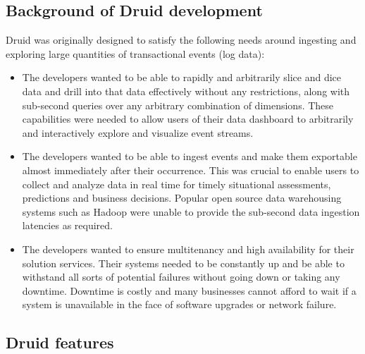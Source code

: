 \documentclass[letterpaper,10pt,english]{sphinxmanual}
\begin{document}
\subsection{Background of Druid development}
\label{\detokenize{discovery/part01/druid_background:druid}}\label{\detokenize{discovery/part01/druid_background::doc}}
Druid was originally designed to satisfy the following needs around ingesting and exploring large quantities of transactional events (log data):
\begin{itemize}
\item {} 
The developers wanted to be able to rapidly and arbitrarily slice and dice data and drill into that data effectively without any restrictions, along with sub-second queries over any arbitrary combination of dimensions. These capabilities were needed to allow users of their data dashboard to arbitrarily and interactively explore and visualize event streams.

\item {} 
The developers wanted to be able to ingest events and make them exportable almost immediately after their occurrence. This was crucial to enable users to collect and analyze data in real time for timely situational assessments, predictions and business decisions. Popular open source data warehousing systems such as Hadoop were unable to provide the sub-second data ingestion latencies as required.

\item {} 
The developers wanted to ensure multitenancy and high availability for their solution services. Their systems needed to be constantly up and be able to withstand all sorts of potential failures without going down or taking any downtime. Downtime is costly and many businesses cannot afford to wait if a system is unavailable in the face of software upgrades or network failure.

\end{itemize}


\subsection{Druid features}
\label{\detokenize{discovery/part01/druid_features:druid}}\label{\detokenize{discovery/part01/druid_features::doc}}
\end{document}
